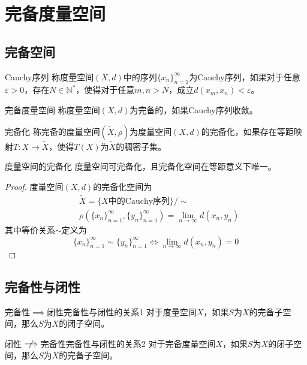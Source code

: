 \documentclass[lang = cn, scheme = chinese, thmcnt = section]{elegantbook}
\newcommand{\N}{\mathbb{N}}            %
\begin{document}
\section{完备度量空间}

\subsection{完备空间}

\begin{definition}{Cauchy序列}
	称度量空间$( X,d)$中的序列$\{x_n\}_{n=1}^{\infty}$为Cauchy序列，如果对于任意$\varepsilon>0$，存在$N\in\N^*$，使得对于任意$m,n>N$，成立$d(x_m,x_n)<\varepsilon$。
\end{definition}

\begin{definition}{完备度量空间}
	称度量空间$(X,d)$为完备的，如果Cauchy序列收敛。
\end{definition}

\begin{definition}{完备化}
	称完备的度量空间$(\tilde{X},\rho)$为度量空间$(X,d)$的完备化，如果存在等距映射$T:X\to \tilde{X}$，使得$T(X)$为$\tilde{X}$的稠密子集。
\end{definition}

\begin{theorem}{度量空间的完备化}
	度量空间可完备化，且完备化空间在等距意义下唯一。
\end{theorem}

\begin{proof}
	度量空间$(X,d)$的完备化空间为
	\begin{align*}
		&\tilde{X}=\{ X\text{中的Cauchy序列} \}/\sim\\
		&\rho(\{x_n\}_{n=1}^{\infty},\{y_n\}_{n=1}^{\infty})=\lim_{n\to\infty}d(x_n,y_n)
	\end{align*}
	其中等价关系$\sim$定义为
	$$
	\{ x_n \}_{n=1}^{\infty}\sim \{ y_n \}_{n=1}^{\infty}\iff \lim_{n\to\infty}d(x_n,y_n)=0
	$$
\end{proof}

\subsection{完备性与闭性}

\begin{theorem}{完备性$\implies$闭性}{完备性与闭性的关系1}
	对于度量空间$X$，如果$S$为$X$的完备子空间，那么$S$为$X$的闭子空间。
\end{theorem}

\begin{theorem}{闭性$\centernot\implies$完备性}{完备性与闭性的关系2}
	对于完备度量空间$X$，如果$S$为$X$的闭子空间，那么$S$为$X$的完备子空间。
\end{theorem}
\end{document}
